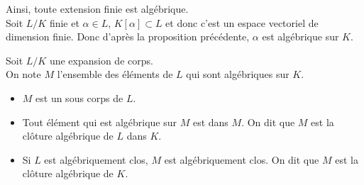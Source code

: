 \begin{remarque}
	Ainsi, toute extension finie est algébrique.\\
	Soit $L/K$ finie et $\alpha \in L$, $K[\alpha] \subset L$ et donc c'est un espace vectoriel de dimension finie. Donc d'après la proposition précédente, $\alpha$ est algébrique sur $K$.
\end{remarque}

\begin{theorem}
	Soit $L/K$ une expansion de corps.\\
	On note $M$ l'ensemble des éléments de $L$ qui sont algébriques sur $K$.
	\begin{itemize}
		\item $M$ est un sous corps de $L$.
		\item Tout élément qui est algébrique sur $M$ est dans $M$. On dit que $M$ est la clôture algébrique de $L$ dans $K$.
		\item Si $L$ est algébriquement clos, $M$ est algébriquement clos. On dit que $M$ est la clôture algébrique de $K$.
	\end{itemize}
\end{theorem}




